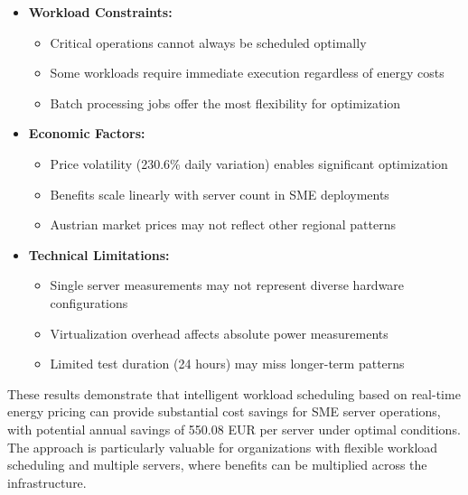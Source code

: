 \begin{itemize}[noitemsep,topsep=0pt]
    \item \textbf{Workload Constraints:}
    \begin{itemize}[noitemsep]
        \item Critical operations cannot always be scheduled optimally
        \item Some workloads require immediate execution regardless of energy costs
        \item Batch processing jobs offer the most flexibility for optimization
    \end{itemize}
    
    \item \textbf{Economic Factors:}
    \begin{itemize}[noitemsep]
        \item Price volatility (230.6\% daily variation) enables significant optimization
        \item Benefits scale linearly with server count in SME deployments
        \item Austrian market prices may not reflect other regional patterns
    \end{itemize}
    
    \item \textbf{Technical Limitations:}
    \begin{itemize}[noitemsep]
        \item Single server measurements may not represent diverse hardware configurations
        \item Virtualization overhead affects absolute power measurements
        \item Limited test duration (24 hours) may miss longer-term patterns
    \end{itemize}
\end{itemize}

These results demonstrate that intelligent workload scheduling based on real-time energy pricing can provide substantial cost savings for SME server operations, with potential annual savings of 550.08 EUR per server under optimal conditions. The approach is particularly valuable for organizations with flexible workload scheduling and multiple servers, where benefits can be multiplied across the infrastructure. 